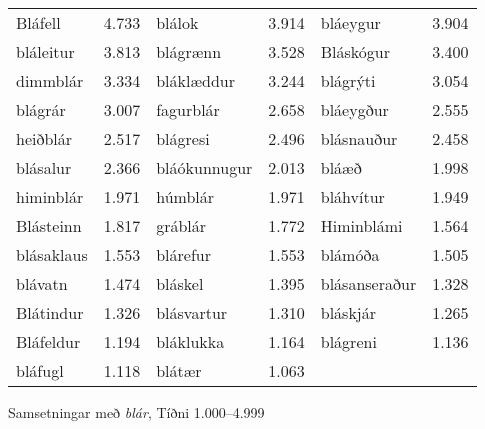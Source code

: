 \documentclass[../samsetningasafn.tex]{subfiles}
\begin{document}
\begin{wordlist}[H]
\begin{tcolorbox}

	\setlength{\extrarowheight}{3pt}
	\begin{tabular}{BlBlBl}
		Bláfell		& 4.733		& 		
		blálok		& 3.914		& 	
		bláeygur		& 3.904		\\ 		
		bláleitur		& 3.813		& 		
		blágrænn	& 3.528		& 	
		Bláskógur	& 3.400		\\ 	
		dimmblár	& 3.334		& 	
		bláklæddur	& 3.244		& 	
		blágrýti		& 3.054		\\ 		
		blágrár		& 3.007		& 		
		fagurblár	& 2.658		& 		
		bláeygður	& 2.555		\\ 	
		heiðblár		& 2.517		& 		
		blágresi		& 2.496		& 		
		blásnauður	& 2.458		\\ 	
		blásalur		& 2.366		& 		
		bláókunnugur & 2.013	& 		
		bláæð		& 1.998		\\ 		
		himinblár	& 1.971		& 		
		húmblár		& 1.971		& 		
		bláhvítur	& 1.949		\\ 		
		Blásteinn	& 1.817		& 		
		gráblár		& 1.772		& 		
		Himinblámi	& 1.564		\\ 	
		blásaklaus	& 1.553		& 
		blárefur		& 1.553		& 		
		blámóða		& 1.505		\\ 		
		blávatn		& 1.474		& 		
		bláskel		& 1.395 		& 		
		blásanseraður & 1.328	\\ 	
		Blátindur	& 1.326		& 		
		blásvartur	& 1.310		& 	
		bláskjár		& 1.265		\\ 		
		Bláfeldur	& 1.194		& 		
		bláklukka	& 1.164		& 		
		blágreni		& 1.136		\\ 		
		bláfugl		& 1.118		& 		
		blátær		& 1.063		& 	
					&
	\end{tabular}

\end{tcolorbox}
	\caption{Samsetningar með \textit{blár}, Tíðni 1.000--4.999}
	\label{listi:blatt.1000}
\end{wordlist}	
\end{document}
